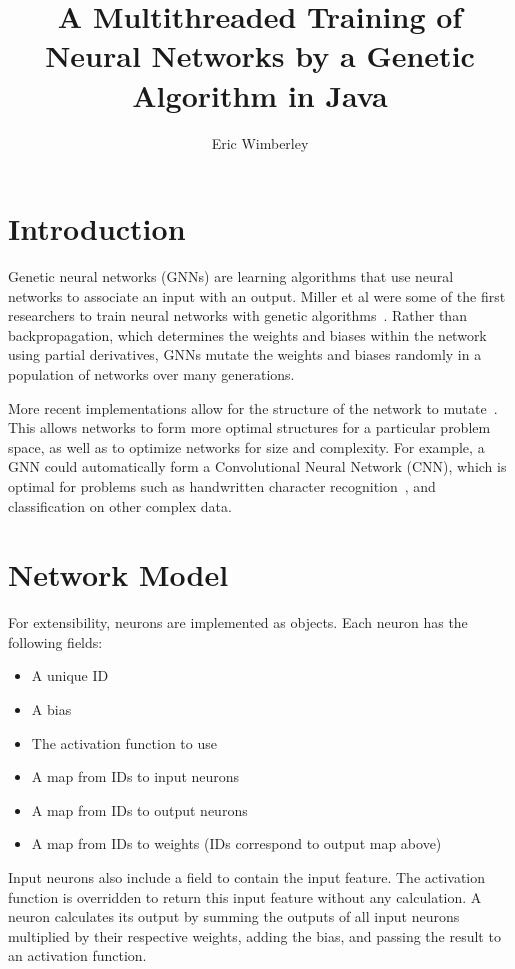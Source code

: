 \documentclass[twocolumn]{article}
\title{A Multithreaded Training of Neural Networks by a Genetic Algorithm in Java}
\author{Eric Wimberley}
\begin{document}
\maketitle

\begin{abstract}
\lipsum[1]
\end{abstract}

\section{Introduction}
Genetic neural networks (GNNs) are learning algorithms that use neural networks to associate an input with an output. Miller et al were some of the first researchers to train neural networks with genetic algorithms~\cite{MillerToddHedge}. Rather than backpropagation, which determines the weights and biases within the network using partial derivatives, GNNs mutate the weights and biases randomly in a population of networks over many generations.

More recent implementations allow for the structure of the network to mutate~\cite{LamStructure}. This allows networks to form more optimal structures for a particular problem space, as well as to optimize networks for size and complexity. For example, a GNN could automatically form a Convolutional Neural Network (CNN), which is optimal for problems such as handwritten character recognition~\cite{ConvolutionalCharacterClassification}, and classification on other complex data. 

\section{Network Model}
For extensibility, neurons are implemented as objects. Each neuron has the following fields:

\begin{itemize}
	\item A unique ID 
	\item A bias
	\item The activation function to use
	\item A map from IDs to input neurons
	\item A map from IDs to output neurons
 	\item A map from IDs to weights (IDs correspond to output map above)
\end{itemize}

Input neurons also include a field to contain the input feature. The activation function is overridden to return this input feature without any calculation. A neuron calculates its output by summing the outputs of all input neurons multiplied by their respective weights, adding the bias, and passing the result to an activation function. 
\end{document}
